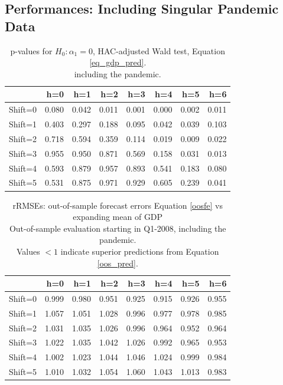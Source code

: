 \documentclass[11pt,a4paper]{article}
\begin{document}
\newpage
\subsection{Performances: Including Singular Pandemic Data}



\begin{table}[ht]
\centering
\begin{tabular}{rrrrrrrr}
  \hline
 & h=0 & h=1 & h=2 & h=3 & h=4 & h=5 & h=6 \\ 
  \hline
Shift=0 & 0.080 & 0.042 & 0.011 & 0.001 & 0.000 & 0.002 & 0.011 \\ 
  Shift=1 & 0.403 & 0.297 & 0.188 & 0.095 & 0.042 & 0.039 & 0.103 \\ 
  Shift=2 & 0.718 & 0.594 & 0.359 & 0.114 & 0.019 & 0.009 & 0.022 \\ 
  Shift=3 & 0.955 & 0.950 & 0.871 & 0.569 & 0.158 & 0.031 & 0.013 \\ 
  Shift=4 & 0.593 & 0.879 & 0.957 & 0.893 & 0.541 & 0.183 & 0.080 \\ 
  Shift=5 & 0.531 & 0.875 & 0.971 & 0.929 & 0.605 & 0.239 & 0.041 \\ 
   \hline
\end{tabular}
\caption{p-values for $H_0: {\alpha_1} = 0$, HAC-adjusted Wald test, Equation \ref{eq_gdp_pred}.\\ including the pandemic.} 
\label{p_val1}
\end{table}%
\begin{table}[ht]
\centering
\begin{tabular}{rrrrrrrr}
  \hline
 & h=0 & h=1 & h=2 & h=3 & h=4 & h=5 & h=6 \\ 
  \hline
Shift=0 & 0.999 & 0.980 & 0.951 & 0.925 & 0.915 & 0.926 & 0.955 \\ 
  Shift=1 & 1.057 & 1.051 & 1.028 & 0.996 & 0.977 & 0.978 & 0.985 \\ 
  Shift=2 & 1.031 & 1.035 & 1.026 & 0.996 & 0.964 & 0.952 & 0.964 \\ 
  Shift=3 & 1.022 & 1.035 & 1.042 & 1.026 & 0.992 & 0.965 & 0.953 \\ 
  Shift=4 & 1.002 & 1.023 & 1.044 & 1.046 & 1.024 & 0.999 & 0.984 \\ 
  Shift=5 & 1.010 & 1.032 & 1.054 & 1.060 & 1.043 & 1.013 & 0.983 \\  
   \hline
\end{tabular}
\caption{rRMSEs: out-of-sample forecast errors Equation \ref{oosfe} vs expanding mean of GDP\\Out-of-sample evaluation starting in Q1-2008, including the pandemic.\\Values $< 1$ indicate superior predictions from Equation \ref{oos_pred}.} 
\label{rRMSE_mSSA_comp_mean2}
\end{table}%
\end{document}

